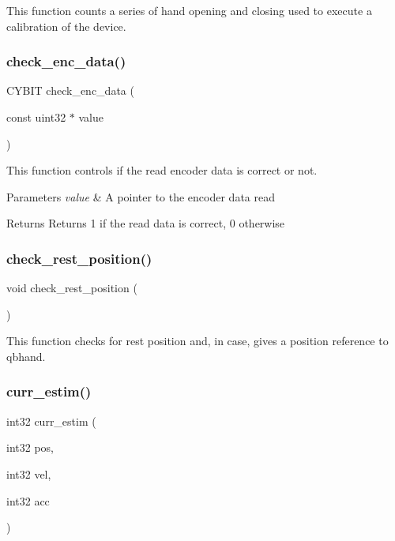 This function counts a series of hand opening and closing used to execute a calibration of the device. \mbox{\label{utils_8h_ae7faec5b3a1d000c90f70abfc1dfca92}} 
\subsubsection{check\+\_\+enc\+\_\+data()}
{\footnotesize\ttfamily C\+Y\+B\+IT check\+\_\+enc\+\_\+data (\begin{DoxyParamCaption}\item[{const uint32 $\ast$}]{value }\end{DoxyParamCaption})}

This function controls if the read encoder data is correct or not.


\begin{DoxyParams}{Parameters}
{\em value} & A pointer to the encoder data read\\
\hline
\end{DoxyParams}
\begin{DoxyReturn}{Returns}
Returns 1 if the read data is correct, 0 otherwise 
\end{DoxyReturn}
\mbox{\label{utils_8h_a2cb024aea0170c085d18670f5a851df8}} 
\subsubsection{check\+\_\+rest\+\_\+position()}
{\footnotesize\ttfamily void check\+\_\+rest\+\_\+position (\begin{DoxyParamCaption}{ }\end{DoxyParamCaption})}

This function checks for rest position and, in case, gives a position reference to qbhand. \mbox{\label{utils_8h_a2a9b9e0226b8dfe02b028d4f87a814ef}} 
\subsubsection{curr\+\_\+estim()}
{\footnotesize\ttfamily int32 curr\+\_\+estim (\begin{DoxyParamCaption}\item[{int32}]{pos,  }\item[{int32}]{vel,  }\item[{int32}]{acc }\end{DoxyParamCaption})}

